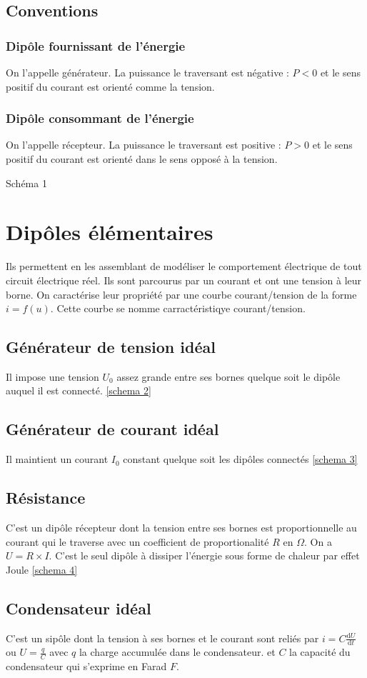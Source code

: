 \documentclass[french]{yLectureNote}
\begin{document}
\subsection{Conventions}
\subsubsection{Dip\^ole fournissant de l'énergie}
On l'appelle générateur. La puissance le traversant est négative : $P<0$ et le sens positif du courant est orienté comme la tension.
\subsubsection{Dip\^ole consommant de l'énergie}
On l'appelle récepteur. La puissance le traversant est positive : $P>0$ et le sens positif du courant est orienté dans le sens opposé à la tension.

Schéma 1
\section{Dip\^oles élémentaires}
Ils permettent en les assemblant  de modéliser le comportement électrique de tout circuit électrique réel. Ils sont parcourus par un courant et ont une tension à leur borne. On caractérise leur propriété par une courbe courant/tension de la forme \(i = f(u)\). Cette courbe se nomme carractéristiqye courant/tension.
\subsection{Générateur de tension idéal}
Il impose une tension $U_0$ assez grande entre ses bornes quelque soit le dip\^ole auquel il est connecté. \ref{schema 2}
\subsection{Générateur de courant idéal}
Il maintient un courant $I_0$ constant quelque soit les dip\^oles connectés \ref{schema 3}
\subsection{Résistance}
C'est un dip\^ole récepteur dont la tension entre ses bornes est proportionnelle au courant qui le traverse avec un coefficient de proportionalité $R$ en $\Omega$. On a $U=R\times I$. C'est le seul dip\^ole à dissiper l'énergie sous forme de chaleur par effet Joule \ref{schema 4}
\subsection{Condensateur idéal}
C'est un sip\^ole dont la tension à ses bornes et le courant sont reliés par $i = C \frac{\mathrm{d}U}{\mathrm{d}t}$ ou $U = \frac{q}{C}$ avec $q$ la charge accumulée dans le condensateur. et $C$ la capacité du condensateur qui s'exprime en Farad $F$.
\end{document}
